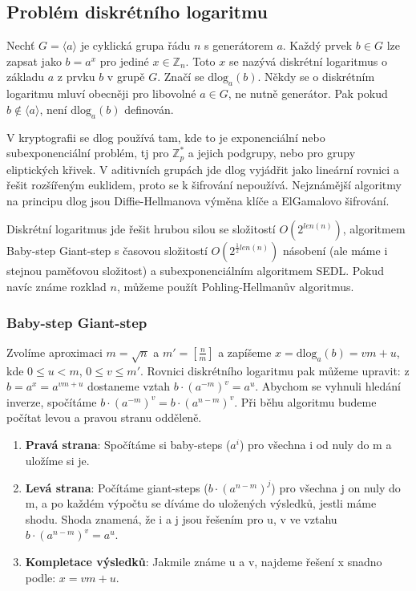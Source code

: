 \subsection{Problém diskrétního logaritmu}
Nechť $G = \langle a \rangle$ je cyklická grupa řádu $n$ s generátorem $a$.
Každý prvek $b \in G$ lze zapsat jako $b = a^x$ pro jediné $x \in \mathbb{Z}_n$.
Toto $x$ se nazývá diskrétní logaritmus o základu $a$ z prvku $b$ v grupě $G$.
Značí se $\text{dlog}_a (b)$. Někdy se o diskrétním logaritmu mluví obecněji pro
libovolné $a \in G$, ne nutně generátor. Pak pokud $b \notin \langle a \rangle$,
není $\text{dlog}_a (b)$ definován.

V kryptografii se dlog používá tam, kde to je exponenciální nebo
subexponenciální problém, tj pro $\mathbb{Z}_p^*$ a jejich podgrupy, nebo pro
grupy eliptických křivek. V aditivních grupách jde dlog vyjádřit jako lineární
rovnici a řešit rozšířeným euklidem, proto se k šifrování nepoužívá. Nejznámější
algoritmy na principu dlog jsou Diffie-Hellmanova výměna klíče a ElGamalovo
šifrování.

Diskrétní logaritmus jde řešit hrubou silou se složitostí $O(2^{len(n)})$,
algoritmem Baby-step Giant-step s časovou složitostí $O(2^{\frac{1}{2}len(n)})$
násobení (ale máme i stejnou paměťovou složitost) a subexponenciálním algoritmem
SEDL. Pokud navíc známe rozklad $n$, můžeme použít Pohling-Hellmanův algoritmus.

\subsubsection{Baby-step Giant-step}
Zvolíme aproximaci $m = \sqrt{n}$ a $m' = [ \frac{n}{m}]$ a zapíšeme $x =
\text{dlog}_a (b) = vm + u$, kde $0 \leq u < m$, $0 \leq v \leq m'$. Rovnici
diskrétního logaritmu pak můžeme upravit: z $b = a^x = a^{vm + u}$ dostaneme
vztah $b\cdot (a^{-m})^v = a^u$. Abychom se vyhnuli hledání inverze, spočítáme
$b\cdot (a^{-m})^v = b\cdot (a^{n-m})^v$. Při běhu algoritmu budeme počítat
levou a pravou stranu odděleně. 

\begin{enumerate}
\item \textbf{Pravá strana}: Spočítáme si baby-steps ($a^i$) pro všechna i od
nuly do m a uložíme si je.
\item\textbf{Levá strana}: Počítáme giant-steps ($b\cdot (a^{n-m})^j$) pro
všechna j on nuly do m, a po každém výpočtu se díváme do uložených výsledků,
jestli máme shodu. Shoda znamená, že i a j jsou řešením pro u, v ve vztahu
$b\cdot (a^{n-m})^v = a^u$.
\item \textbf{Kompletace výsledků}: Jakmile známe u a v, najdeme řešení x snadno
podle: $x = vm + u$.
\end{enumerate}


